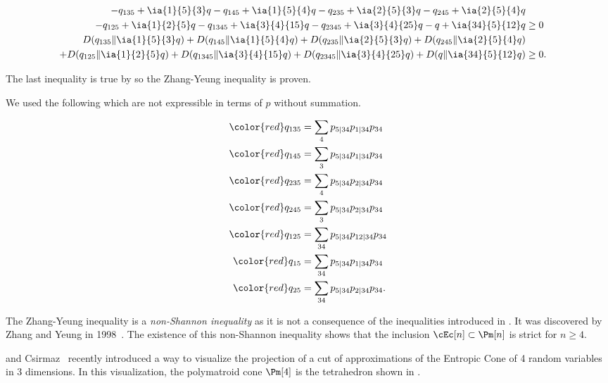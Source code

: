 \documentclass[11pt,twoside,a4paper,openright]{uclouvain-thesis}
\begin{document}
\begin{myexem}
\begin{align}
  \notag
   - q_{135} + \ia{1}{5}{3}q - q_{145} + \ia{1}{5}{4}q - q_{235} + \ia{2}{5}{3}q - q_{245} + \ia{2}{5}{4}q\\
   \label{eq:nodiv}
   - q_{125} + \ia{1}{2}{5}q - q_{1345} + \ia{3}{4}{15}q - q_{2345} + \ia{3}{4}{25}q - q + \ia{34}{5}{12}q & \geq 0\\
  \notag
  D(q_{135} \| \ia{1}{5}{3}q) + D(q_{145} \| \ia{1}{5}{4}q) + D(q_{235} \| \ia{2}{5}{3}q) + D(q_{245} \| \ia{2}{5}{4}q)\\
   \label{eq:div}
  + D(q_{125} \| \ia{1}{2}{5}q) + D(q_{1345} \| \ia{3}{4}{15}q) + D(q_{2345} \| \ia{3}{4}{25}q) + D(q \| \ia{34}{5}{12}q) & \geq 0.
\end{align}

The last inequality is true by  so the Zhang-Yeung inequality is proven.

We used the following \pmf{} which are not expressible in terms of $p$ without summation.

\begin{align*}
  {\color{red}q_{135}} & = \sum_4 p_{5|34}p_{1|34}p_{34}\\
  {\color{red}q_{145}} & = \sum_3 p_{5|34}p_{1|34}p_{34}\\
  {\color{red}q_{235}} & = \sum_4 p_{5|34}p_{2|34}p_{34}\\
  {\color{red}q_{245}} & = \sum_3 p_{5|34}p_{2|34}p_{34}\\
  {\color{red}q_{125}} & = \sum_{34} p_{5|34}p_{12|34}p_{34}\\
  {\color{red}q_{15}} & = \sum_{34} p_{5|34}p_{1|34}p_{34}\\
  {\color{red}q_{25}} & = \sum_{34} p_{5|34}p_{2|34}p_{34}.
\end{align*}
\end{myexem}

The Zhang-Yeung inequality is a \emph{non-Shannon inequality} as it is not a consequence of the inequalities introduced in .
It was discovered by Zhang and Yeung in 1998~\cite{zhang1998characterization}.
The existence of this non-Shannon inequality shows that the inclusion $\cEc[n] \subset \Pm[n]$ is strict for $n \geq 4$.

\matus{} and Csirmaz~\cite{matus2013entropy} recently introduced a way to visualize the projection of a cut of approximations of the Entropic Cone of 4 random variables in 3 dimensions.
In this visualization, the polymatroid cone $\Pm[4]$ is the tetrahedron shown in .
\end{document}
